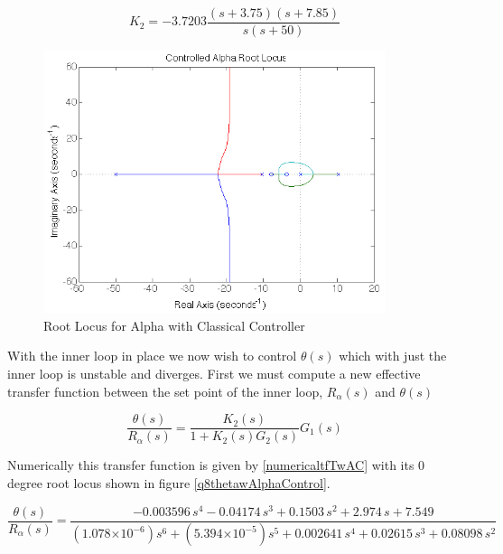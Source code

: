 \documentclass{article}
\theoremstyle{plain}
\theoremstyle{definition}
\theoremstyle{remark}
\providecommand{\e}[1]{\ensuremath{\times 10^{#1}}}
\begin{document}
\begin{equation}
K_{2} = -3.7203\frac{(s + 3.75)(s + 7.85)}{s(s+50)} 
\label{alphaController}
\end{equation}

\begin{figure}
\begin{center}
\includegraphics[width = 10cm]{controlledAlpha.png}
\end{center}
\caption{Root Locus for Alpha with Classical Controller}
\label{q8controlledAlpha}
\end{figure}

With the inner loop in place we now wish to control $\theta(s)$ which with just the inner loop is unstable and diverges.  First we must compute a new effective transfer function between the set point of the inner loop, $R_{\alpha}(s)$ and $\theta(s)$

\begin{equation}
\frac{\theta(s)}{R_{\alpha}(s)} = \frac{K_2(s)}{1 + K_2(s) G_2(s)} G_1(s)
\end{equation}

Numerically this transfer function is given by \eqref{numericaltfTwAC} with its 0 degree root locus shown in figure \ref{q8thetawAlphaControl}.

\begin{equation}
\frac{\theta(s)}{R_{\alpha}(s)} = \frac{-0.003596 \, s^4 - 0.04174\,  s^3 + 0.1503 \, s^2 + 2.974\, s + 7.549}{(1.078\e{-6}) s^6 + (5.394\e{-5}) s^5 + 0.002641 \, s^4 + 0.02615 \, s^3 + 0.08098 \, s^2}
\label{numericaltfTwAC}
\end{equation}
\end{document}
